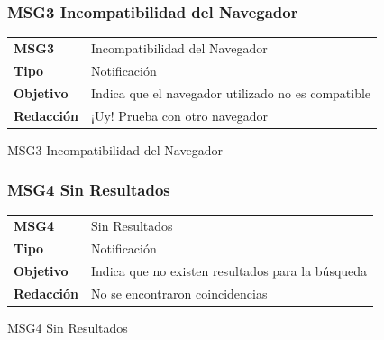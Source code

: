 \documentclass[14pt]{article}
\begin{document}
            \subsubsection{MSG3 Incompatibilidad del Navegador}\label{MSG3 Incompatibilidad del Navegador}
                \begin{table}[H]
                    \begin{center}
                        \begin{tabular}{| l | l | } \hline
                        \textbf{MSG3} & Incompatibilidad del Navegador \\
                        \textbf{Tipo} & Notificación \\
                        \textbf{Objetivo} & Indica que el navegador utilizado no es compatible \\
                        \textbf{Redacción} & ¡Uy! Prueba con otro navegador\\ \hline
                        \end{tabular}
                        
                        \vspace{0.3cm} MSG3 Incompatibilidad del Navegador
                    \end{center}
                \end{table}
                
            \subsubsection{MSG4 Sin Resultados}\label{MSG4 Sin Resultados}
                \begin{table}[H]
                    \begin{center}
                        \begin{tabular}{| l | l | } \hline
                        \textbf{MSG4} & Sin Resultados \\
                        \textbf{Tipo} & Notificación \\
                        \textbf{Objetivo} & Indica que no existen resultados para la búsqueda \\
                        \textbf{Redacción} & No se encontraron coincidencias \\ \hline
                        \end{tabular}
                        
                        \vspace{0.3cm} MSG4 Sin Resultados
                    \end{center}
                \end{table}
                
\end{document}
